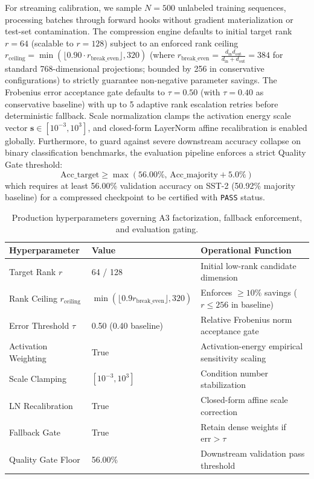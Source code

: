 For streaming calibration, we sample $N = 500$ unlabeled training sequences, processing batches through forward hooks without gradient materialization or test-set contamination. The compression engine defaults to initial target rank $r = 64$ (scalable to $r=128$) subject to an enforced rank ceiling $r_{\mathrm{ceiling}} = \min(\lfloor 0.90 \cdot r_{\mathrm{break\_even}}\rfloor, 320)$ (where $r_{\mathrm{break\_even}} = \frac{d_{\mathrm{in}} d_{\mathrm{out}}}{d_{\mathrm{in}} + d_{\mathrm{out}}} = 384$ for standard 768-dimensional projections; bounded by 256 in conservative configurations) to strictly guarantee non-negative parameter savings. The Frobenius error acceptance gate defaults to $\tau = 0.50$ (with $\tau = 0.40$ as conservative baseline) with up to 5 adaptive rank escalation retries before deterministic fallback. Scale normalization clamps the activation energy scale vector $\mathbf{s} \in [10^{-3}, 10^{3}]$, and closed-form LayerNorm affine recalibration is enabled globally. Furthermore, to guard against severe downstream accuracy collapse on binary classification benchmarks, the evaluation pipeline enforces a strict Quality Gate threshold:
\[
\mathrm{Acc}\_{\mathrm{target}} \ge \max(56.00\%,\, \mathrm{Acc}\_{\mathrm{majority}} + 5.0\%)
\tag{6.1}
\]
which requires at least 56.00\% validation accuracy on SST-2 (50.92\% majority baseline) for a compressed checkpoint to be certified with \texttt{PASS} status.

\begin{table}[H]
\centering
\small
\begin{tabular}{lll}
\toprule
\textbf{Hyperparameter} & \textbf{Value} & \textbf{Operational Function} \\
\midrule
Target Rank $r$ & 64 / 128 & Initial low-rank candidate dimension \\
Rank Ceiling $r_{\mathrm{ceiling}}$ & $\min(\lfloor 0.9 r_{\mathrm{break\_even}}\rfloor, 320)$ & Enforces $\ge 10\%$ savings ($r \le 256$ in baseline) \\
Error Threshold $\tau$ & 0.50 (0.40 baseline) & Relative Frobenius norm acceptance gate \\
Activation Weighting & True & Activation-energy empirical sensitivity scaling \\
Scale Clamping & $[10^{-3}, 10^{3}]$ & Condition number stabilization \\
LN Recalibration & True & Closed-form affine scale correction \\
Fallback Gate & True & Retain dense weights if $\mathrm{err} > \tau$ \\
Quality Gate Floor & 56.00\% & Downstream validation pass threshold \\
\bottomrule
\end{tabular}
\caption{Production hyperparameters governing A3 factorization, fallback enforcement, and evaluation gating.}
\label{tab:a3_hyperparameters}
\end{table}


